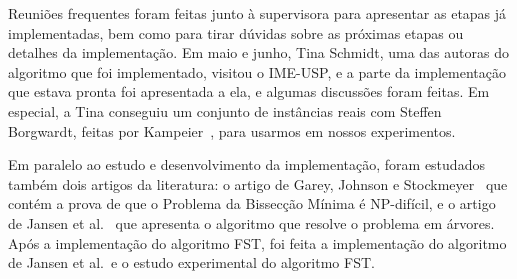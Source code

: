 Reuniões frequentes foram feitas junto à supervisora para 
apresentar as etapas já implementadas, bem como para tirar dúvidas 
sobre as próximas etapas ou detalhes da implementação. 
Em maio e junho, Tina Schmidt, uma das autoras do algoritmo que 
foi implementado, visitou o IME-USP, e a parte da 
implementação que estava pronta foi apresentada a ela, e 
algumas discussões foram feitas. 
Em especial, a Tina conseguiu
um conjunto de instâncias reais com Steffen Borgwardt, feitas por 
Kampeier~\cite{Kampmeier}, para usarmos 
em nossos experimentos.   

Em paralelo ao estudo e desenvolvimento da implementação, foram 
estudados também dois artigos da literatura: o artigo 
de Garey, 
Johnson e Stockmeyer~\cite{GareyJS76} que contém a prova de que o 
Problema da Bissecção Mínima é NP-difícil, e o artigo de 
Jansen et al.~\cite{JansenKLS01} que apresenta 
o algoritmo que resolve o problema em árvores. 
Após a implementação do algoritmo FST, foi feita 
a implementação do algoritmo de Jansen et al.\ e o estudo
experimental do algoritmo FST. 
